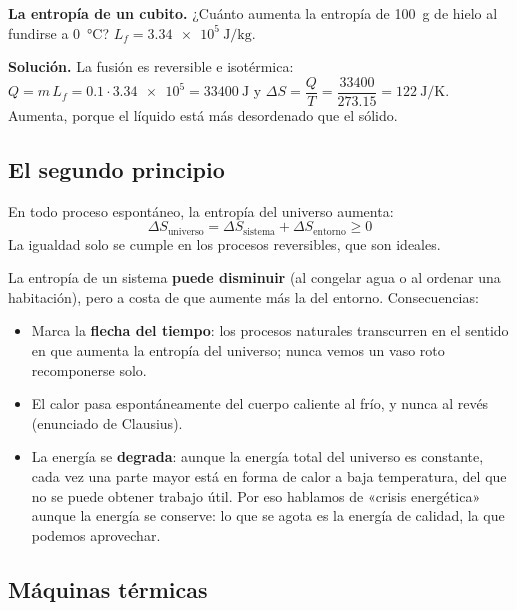 \begin{example}
    \textbf{La entropía de un cubito.} ¿Cuánto aumenta la entropía de \qty{100}{\g} de hielo al fundirse a \qty{0}{\degreeCelsius}?
    \(L_f = \qty{3.34e5}{\joule\per\kg}\).

    \textbf{Solución.} La fusión es reversible e isotérmica: \(Q = m\,L_f = \num{0.1} \cdot \num{3.34e5} = \qty{33400}{\joule}\) y
    \(\Delta S = \dfrac{Q}{T} = \dfrac{33400}{\num{273.15}} = \qty{+122}{\joule\per\kelvin}\). Aumenta, porque el líquido está más
    desordenado que el sólido.
\end{example}

\subsection{El segundo principio}

\begin{definition}
    En todo proceso espontáneo, la entropía del universo aumenta:
    \[ \Delta S_{\text{universo}} = \Delta S_{\text{sistema}} + \Delta S_{\text{entorno}} \geq 0 \]
    La igualdad solo se cumple en los procesos reversibles, que son ideales.
\end{definition}

La entropía de un sistema \textbf{puede disminuir} (al congelar agua o al ordenar una habitación), pero a costa de que aumente más
la del entorno. Consecuencias:
\begin{itemize}
    \item Marca la \textbf{flecha del tiempo}: los procesos naturales transcurren en el sentido en que aumenta la entropía del
    universo; nunca vemos un vaso roto recomponerse solo.
    \item El calor pasa espontáneamente del cuerpo caliente al frío, y nunca al revés (enunciado de Clausius).
    \item La energía se \textbf{degrada}: aunque la energía total del universo es constante, cada vez una parte mayor está en
    forma de calor a baja temperatura, del que no se puede obtener trabajo útil. Por eso hablamos de «crisis energética» aunque la
    energía se conserve: lo que se agota es la energía de calidad, la que podemos aprovechar.
\end{itemize}

\subsection{Máquinas térmicas}


